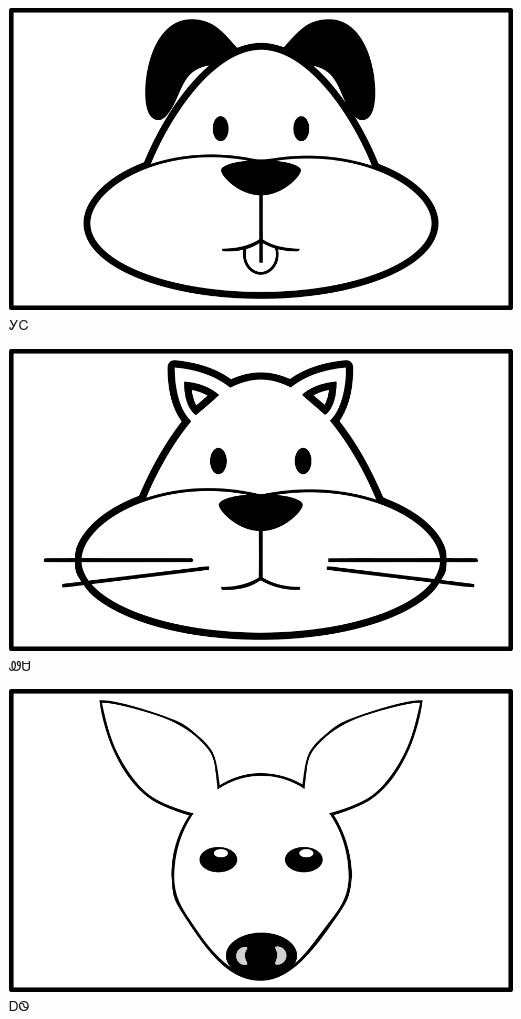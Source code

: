 \documentclass[avery5371]{flashcards}%
\begin{document}

    \begin{flashcard}{
        \includegraphics[width=0.95\columnwidth,height=.51\columnwidth,keepaspectratio]{../artwork/objects-animate/gihli}
    }
        \Huge ᎩᏟ
    \end{flashcard}

    \begin{flashcard}{
        \includegraphics[width=0.95\columnwidth,height=.51\columnwidth,keepaspectratio]{../artwork/objects-animate/wesa}
    }
        \Huge ᏪᏌ
    \end{flashcard}

    \begin{flashcard}{
        \includegraphics[width=0.95\columnwidth,height=.51\columnwidth,keepaspectratio]{../artwork/objects-animate/ahwi}
    }
        \Huge ᎠᏫ
    \end{flashcard}
\end{document}
